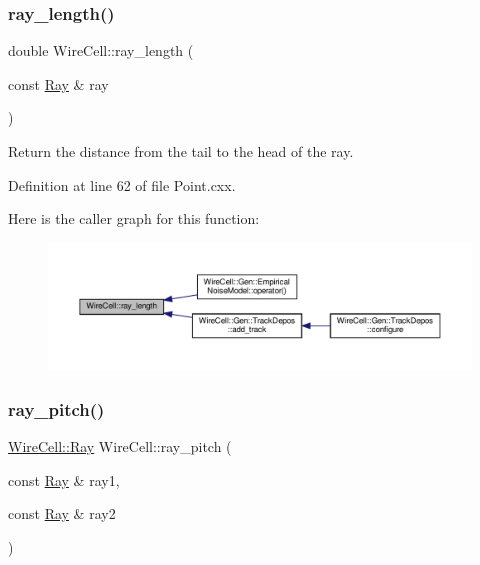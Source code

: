 \subsubsection{\texorpdfstring{ray\+\_\+length()}{ray\_length()}}
{\footnotesize\ttfamily double Wire\+Cell\+::ray\+\_\+length (\begin{DoxyParamCaption}\item[{const \hyperlink{namespace_wire_cell_a3ab20d9b438feb7eb1ffaab9ba98af0c}{Ray} \&}]{ray }\end{DoxyParamCaption})}

Return the distance from the tail to the head of the ray. 

Definition at line 62 of file Point.\+cxx.

Here is the caller graph for this function\+:
\nopagebreak
\begin{figure}[H]
\begin{center}
\leavevmode
\includegraphics[width=350pt]{namespace_wire_cell_a078ec264f4f9f82fe3e6ba21b2108d00_icgraph}
\end{center}
\end{figure}
\mbox{\label{namespace_wire_cell_a8e3ed293f3eefafaec9f8cf97f460a9b}} 
\subsubsection{\texorpdfstring{ray\+\_\+pitch()}{ray\_pitch()}}
{\footnotesize\ttfamily \hyperlink{namespace_wire_cell_a3ab20d9b438feb7eb1ffaab9ba98af0c}{Wire\+Cell\+::\+Ray} Wire\+Cell\+::ray\+\_\+pitch (\begin{DoxyParamCaption}\item[{const \hyperlink{namespace_wire_cell_a3ab20d9b438feb7eb1ffaab9ba98af0c}{Ray} \&}]{ray1,  }\item[{const \hyperlink{namespace_wire_cell_a3ab20d9b438feb7eb1ffaab9ba98af0c}{Ray} \&}]{ray2 }\end{DoxyParamCaption})}


